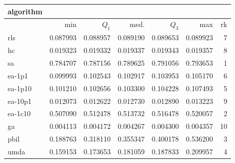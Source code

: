\begin{tabular}{@{}l*{5}{>{{}}N{1}{3}}>{{}}N{2}{0}@{}}
\toprule
{algorithm} &  \\
\midrule
& {min} & {$Q_1$} & {med.} & {$Q_3$} & {max} & {rk}\\
\midrule
rls & 0.087993 & 0.088957 & 0.089190 & 0.089653 & 0.089923 & 7\\
hc & 0.019323 & 0.019332 & 0.019337 & 0.019343 & 0.019357 & 8\\
sa & {\color{blue}} 0.784707 & {\color{blue}} 0.787156 & {\color{blue}} 0.789625 & {\color{blue}} 0.791056 & {\color{blue}} 0.793653 & 1\\
ea-1p1 & 0.099993 & 0.102543 & 0.102917 & 0.103953 & 0.105170 & 6\\
ea-1p10 & 0.101210 & 0.102656 & 0.103300 & 0.104228 & 0.107493 & 5\\
ea-10p1 & 0.012073 & 0.012622 & 0.012730 & 0.012890 & 0.013223 & 9\\
ea-1c10 & 0.507090 & 0.512478 & 0.513732 & 0.516478 & 0.520057 & 2\\
ga & 0.004113 & 0.004172 & 0.004267 & 0.004300 & 0.004357 & 10\\
pbil & 0.188763 & 0.318110 & 0.355347 & 0.400178 & 0.536200 & 3\\
umda & 0.159153 & 0.173653 & 0.181059 & 0.187833 & 0.209957 & 4\\
\bottomrule
\end{tabular}
